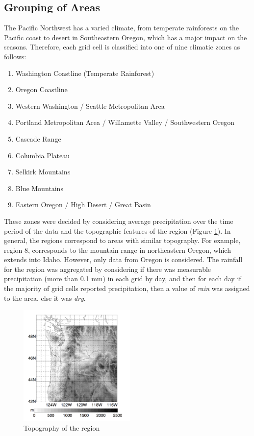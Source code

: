 \documentclass{article}
\begin{document}
\subsection{Grouping of Areas} \label{GroupArea}
The Pacific Northwest has a varied climate, from temperate rainforests on the Pacific coast to desert in Southeastern Oregon, which has a major impact on the seasons. Therefore, each grid cell is classified into one of nine climatic zones as follows:
\begin{enumerate}
\item Washington Coastline (Temperate Rainforest)
\item Oregon Coastline
\item Western Washington / Seattle Metropolitan Area
\item Portland Metropolitan Area / Willamette Valley / Southwestern Oregon
\item Cascade Range
\item Columbia Plateau
\item Selkirk Mountains
\item Blue Mountains
\item Eastern Oregon / High Desert / Great Basin
\end{enumerate}

These zones were decided by considering average precipitation over the time period of the data and the topographic features of the region (Figure \ref{fig:topo}). In general, the regions correspond to areas with similar topography. For example, region 8, corresponds to the mountain range in northeastern Oregon, which extends into Idaho. However, only data from Oregon is considered. The rainfall for the region was aggregated by considering if there was measurable precipitation (more than 0.1 mm) in each grid by day, and then for each day if the majority of grid cells reported precipitation, then a value of \textit{rain} was assigned to the area, else it was \textit{dry}.


\begin{figure}[h!]
\centering
\includegraphics[width = .4\textwidth, height = 6cm]{topography}
\caption{Topography of the region }
\label{fig:topo}
\end{figure}
\end{document}
